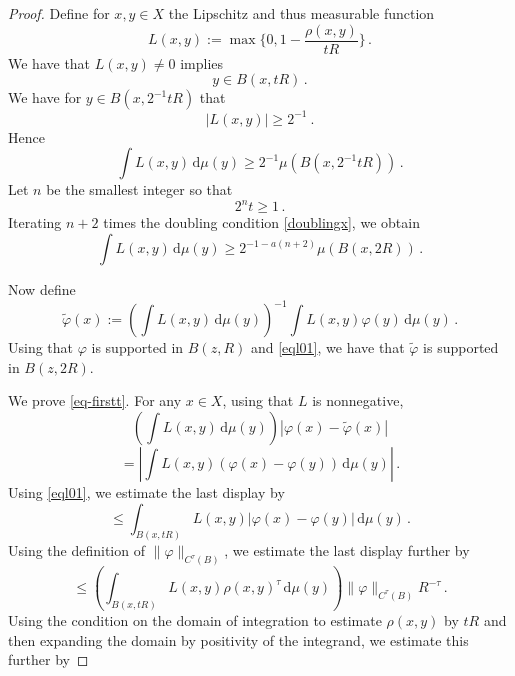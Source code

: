 \begin{proof}
    Define for $x,y\in X$ the Lipschitz and thus measurable function
    \begin{equation}
        L(x,y) := \max\{0, 1 - \frac{\rho(x,y)}{tR}\}\, .
    \end{equation}
We have that $L(x,y)\neq 0$ implies
\begin{equation}\label{eql01}
    y\in B(x, tR)\, .
\end{equation}
We have for $y\in B(x, 2^{-1}tR)$ that
\begin{equation}\label{eql30}
    |L(x,y)|\ge 2^{-1} \ .
\end{equation}
Hence
\begin{equation}
    \int L(x,y) \, \mathrm{d}\mu(y)\ge 2^{-1}\mu(B(x, 2^{-1}tR))\, .
\end{equation}
 Let $n$ be the smallest integer so that
 \begin{equation}\label{2nt1}
    2^nt\ge 1\, .
 \end{equation}
 Iterating $n+2$ times the doubling condition \eqref{doublingx}, we obtain
 \begin{equation}\label{eql32}
    \int L(x,y) \, \mathrm{d}\mu(y)\ge 2^{-1-a(n+2)}\mu(B(x, 2R))\, .
 \end{equation}

Now define
    $$
        \tilde \varphi(x) := \left(\int L(x,y) \, \mathrm{d}\mu(y)\right)^{-1}\int L(x,y) \varphi(y) \, \mathrm{d}\mu(y)\, .
    $$
Using that $\varphi$ is supported in $B(z,R)$ and
\eqref{eql01}, we have that $\tilde{\varphi}$ is supported in $B(z,2R)$.

We prove \eqref{eq-firstt}.
 For any $x\in X$, using that $L$ is nonnegative,
   \begin{equation}\label{eql1}
    \left(\int L(x,y) \, \mathrm{d}\mu(y)\right)
        |\varphi(x) - \tilde \varphi(x)|
    \end{equation}
 \begin{equation}\label{eql2}
 = \left| \int L(x,y)(\varphi(x) - \varphi(y)) \, \mathrm{d}\mu(y)\right|\, .
    \end{equation}
Using \eqref{eql01}, we estimate the last display by
 \begin{equation}\label{eql3}
         \le \int_{B(x, tR)} L(x,y)|\varphi(x) - \varphi(y)| \, \mathrm{d}\mu(y)\, .\end{equation}
  Using the definition of $\|\varphi\|_{C^\tau(B)}$, we estimate the last display further by
       \begin{equation}\label{eql4}
         \le \left(\int_{B(x, tR)} L(x,y)
          \rho(x,y)^\tau \, \mathrm{d}\mu(y) \right)\|\varphi\|_{C^\tau(B)}R^{-\tau}\, .
    \end{equation}
  Using the condition on the domain of integration to estimate $\rho(x,y)$ by $tR$ and then expanding the domain by positivity of the integrand, we estimate this further by


\end{proof}

